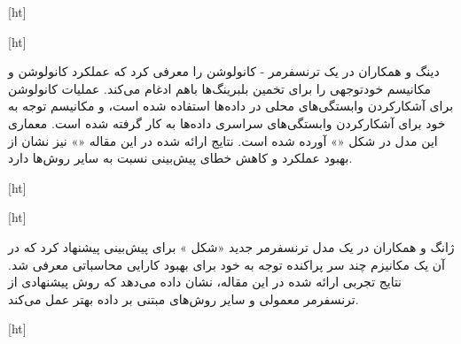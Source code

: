 [ht]



[ht]



دینگ و همکاران در  یک ترنسفرمر - کانولوشن را معرفی کرد که عملکرد کانولوشن و مکانیسم خودتوجهی را برای تخمین  بلبرینگ‌ها باهم ادغام می‌کند. عملیات کانولوشن برای آشکارکردن وابستگی‌های محلی در داده‌ها استفاده شده است، و مکانیسم توجه به خود برای آشکارکردن وابستگی‌های سراسری داده‌ها به کار گرفته شده است. معماری این مدل در شکل «» آورده شده است. نتایج ارائه شده در این مقاله «» نیز نشان از بهبود عملکرد و کاهش خطای پیش‌بینی نسبت به سایر روش‌ها دارد.




[ht]



[ht]




ژانگ و همکاران در  یک مدل ترنسفرمر جدید «شکل » برای پیش‌بینی  پیشنهاد کرد که در آن یک مکانیزم چند سر پراکنده توجه به خود برای بهبود کارایی محاسباتی معرفی شد. نتایج تجربی ارائه شده در این مقاله، نشان داده می‌دهد که روش پیشنهادی از ترنسفرمر معمولی و سایر روش‌های مبتنی بر داده بهتر عمل می‌کند.


[ht]
